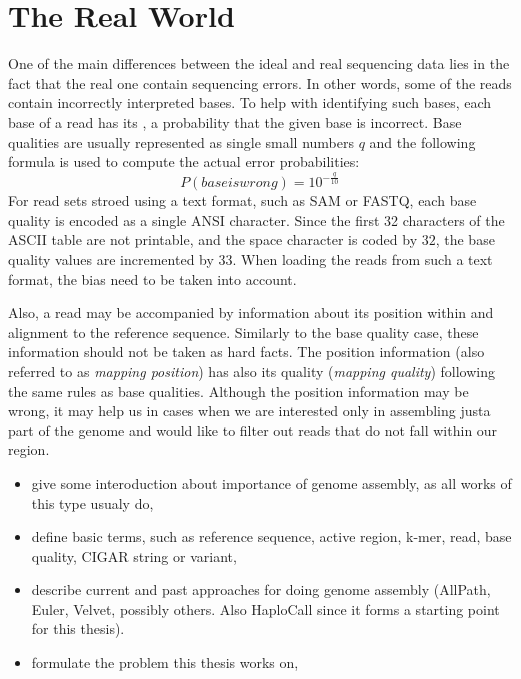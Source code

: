\section{The Real World}
\label{sec:real-world}

One of the main differences between the ideal and real sequencing data lies in the fact that the real one contain sequencing errors. In other words, some of the reads contain incorrectly interpreted bases. To help with identifying such bases, each base of a read has its , a probability that the given base is incorrect. Base qualities are usually represented as single small numbers $q$ and the following formula is used to compute the actual error probabilities:
$$
P(base is wrong) = 10^{-\frac{q}{10}}
$$
For read sets stroed using a text format, such as SAM or FASTQ, each base quality is encoded as a single ANSI character. Since the first 32 characters of the ASCII table are not printable, and the space character is coded by $32$, the base quality values are incremented by $33$. When loading the reads from such a text format, the bias need to be taken into account. 

Also, a read may be accompanied by information about its position within and alignment to the reference sequence. Similarly to the base quality case, these information should not be taken as hard facts. The position information (also referred to as \textit{mapping position}) has also its quality (\textit{mapping quality}) following the same rules as base qualities. Although the position information may be wrong, it may help us in cases when we are interested only in assembling justa part of the genome and would like to filter out reads that do not fall within our region.



\begin{itemize}
\item give some interoduction about importance of genome assembly, as all works of this type usualy do,
\item define basic terms, such as reference sequence, active region, k-mer, read, base quality, CIGAR string or variant,
\item describe current and past approaches for doing genome assembly (AllPath, Euler, Velvet, possibly others. Also HaploCall since it forms a starting point for this thesis). 
\item formulate the problem this thesis works on,
\end{itemize}
